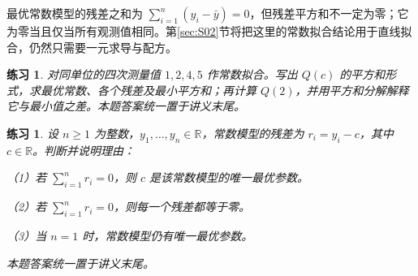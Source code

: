 \documentclass[UTF8,fontset=fandol,11pt]{ctexart}
\newtheorem{exercise}[definition]{练习}
\begin{document}
最优常数模型的残差之和为 $\sum_{i=1}^{n}(y_i-\bar{y})=0$，但残差平方和不一定为零；它为零当且仅当所有观测值相同。第\ref{sec:S02}节将把这里的常数拟合结论用于直线拟合，仍然只需要一元求导与配方。\par
\begin{exercise}
\label{mathagent:exercise:79e91357ee05b8b9aa4c657d553157f1ef411624d282c3f2337dd0e01453ce2d}
对同单位的四次测量值 $1,2,4,5$ 作常数拟合。写出 $Q(c)$ 的平方和形式，求最优常数、各个残差及最小平方和；再计算 $Q(2)$，并用平方和分解解释它与最小值之差。本题答案统一置于讲义末尾。
\end{exercise}
\begin{exercise}
\label{mathagent:exercise:9e7dbf7ef17df1506f236bbf1ad6ff8c14ff13065df89e12b796d18475228be7}
设 $n\geq1$ 为整数，$y_1,\ldots,y_n\in\mathbb{R}$，常数模型的残差为 $r_i=y_i-c$，其中 $c\in\mathbb{R}$。判断并说明理由：

（1）若 $\sum_{i=1}^{n}r_i=0$，则 $c$ 是该常数模型的唯一最优参数。

（2）若 $\sum_{i=1}^{n}r_i=0$，则每一个残差都等于零。

（3）当 $n=1$ 时，常数模型仍有唯一最优参数。

本题答案统一置于讲义末尾。
\end{exercise}
\end{document}
